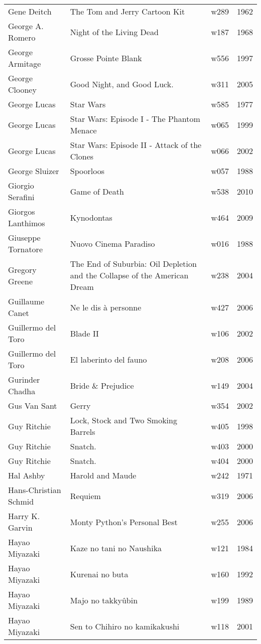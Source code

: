 \documentclass{article}
\begin{document}
\begin {center}
\begin{longtable}{l p{10cm} l l}
Gene Deitch & The Tom and Jerry Cartoon Kit & w289 & 1962 \\
George A. Romero & Night of the Living Dead & w187 & 1968 \\
George Armitage & Grosse Pointe Blank & w556 & 1997 \\
George Clooney & Good Night, and Good Luck. & w311 & 2005 \\
George Lucas & Star Wars & w585 & 1977 \\
George Lucas & Star Wars: Episode I - The Phantom Menace & w065 & 1999 \\
George Lucas & Star Wars: Episode II - Attack of the Clones & w066 & 2002 \\
George Sluizer & Spoorloos & w057 & 1988 \\
Giorgio Serafini & Game of Death & w538 & 2010 \\
Giorgos Lanthimos & Kynodontas & w464 & 2009 \\
Giuseppe Tornatore & Nuovo Cinema Paradiso & w016 & 1988 \\
Gregory Greene & The End of Suburbia: Oil Depletion and the Collapse of the American Dream & w238 & 2004 \\
Guillaume Canet & Ne le dis à personne & w427 & 2006 \\
Guillermo del Toro & Blade II & w106 & 2002 \\
Guillermo del Toro & El laberinto del fauno & w208 & 2006 \\
Gurinder Chadha & Bride \& Prejudice & w149 & 2004 \\
Gus Van Sant & Gerry & w354 & 2002 \\
Guy Ritchie & Lock, Stock and Two Smoking Barrels & w405 & 1998 \\
Guy Ritchie & Snatch. & w403 & 2000 \\
Guy Ritchie & Snatch. & w404 & 2000 \\
Hal Ashby & Harold and Maude & w242 & 1971 \\
Hans-Christian Schmid & Requiem & w319 & 2006 \\
Harry K. Garvin & Monty Python's Personal Best & w255 & 2006 \\
Hayao Miyazaki & Kaze no tani no Naushika & w121 & 1984 \\
Hayao Miyazaki & Kurenai no buta & w160 & 1992 \\
Hayao Miyazaki & Majo no takkyûbin & w199 & 1989 \\
Hayao Miyazaki & Sen to Chihiro no kamikakushi & w118 & 2001 \\

\end{longtable}
\end{center}
\end{document}
